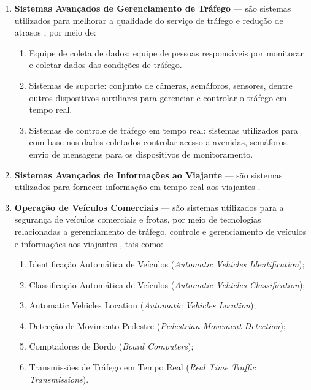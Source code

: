 \documentclass[
	12pt,				%
	oneside,			%
	a4paper,			%
	english,			%
	brazil				%
	]{abntex2ppgsi}
\begin{document}
{\begin{enumerate}
\item \textbf{Sistemas Avançados de Gerenciamento de Tráfego}  --- são sistemas utilizados para melhorar a qualidade do serviço de tráfego e redução de atrasos \cite{figueiredo2001towards}, por meio de:
\begin{enumerate}
\item Equipe de coleta de dados: equipe de pessoas responsáveis por monitorar e coletar dados das condições de tráfego.
\item Sistemas de suporte: conjunto de câmeras, semáforos, sensores, dentre outros dispositivos auxiliares para gerenciar e controlar o tráfego em tempo real.
\item Sistemas de controle de tráfego em tempo real: sistemas utilizados para com base nos dados coletados controlar acesso a avenidas, semáforos, envio de mensagens para os dispositivos de monitoramento.
\end{enumerate}
\item \textbf{Sistemas Avançados de Informações ao Viajante}  --- são sistemas utilizados para fornecer informação em tempo real aos viajantes \cite{figueiredo2001towards}.
\item \textbf{Operação de Veículos Comerciais}  --- são sistemas utilizados para a segurança de veículos comerciais e frotas, por meio de tecnologias relacionadas a gerenciamento de tráfego, controle e gerenciamento de veículos e informações aos viajantes \cite{figueiredo2001towards}, tais como:
\begin{enumerate}
\item Identificação Automática de Veículos (\textit{Automatic Vehicles Identification});
\item Classificação Automática de Veículos (\textit{Automatic Vehicles Classification});
\item Automatic Vehicles Location (\textit{Automatic Vehicles Location});
\item Detecção de Movimento Pedestre (\textit{Pedestrian Movement Detection});
\item Comptadores de Bordo (\textit{Board Computers});
\item Transmissões de Tráfego em Tempo Real (\textit{Real Time Traffic Transmissions}).

\end{enumerate}
\end{enumerate}}
\end{document}
